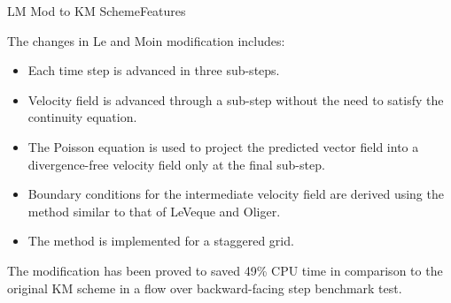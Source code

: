 \documentclass[\string~/GitHub/sthlmNordBeamerTheme/sthlmNordLightDemo.tex]{subfiles}
\begin{document}
\begin{frame}{LM Mod to KM Scheme}{Features}
    
    The changes in Le and Moin modification includes:
    \begin{itemize}
        \item Each time step is advanced in three sub-steps.
        \item Velocity field is advanced through a sub-step without the need to satisfy the continuity equation.
        \item The Poisson equation is used to project the predicted vector field into a divergence-free velocity field only at the final sub-step.
        \item Boundary conditions for the intermediate velocity field are derived using the method similar to that of LeVeque and Oliger.
        \item The method is implemented for a staggered grid.
    \end{itemize}
    
    \remarks The modification has been proved to saved 49\% CPU time in comparison to the original KM scheme in a flow over backward-facing step benchmark test.
    
\end{frame}
\end{document}
